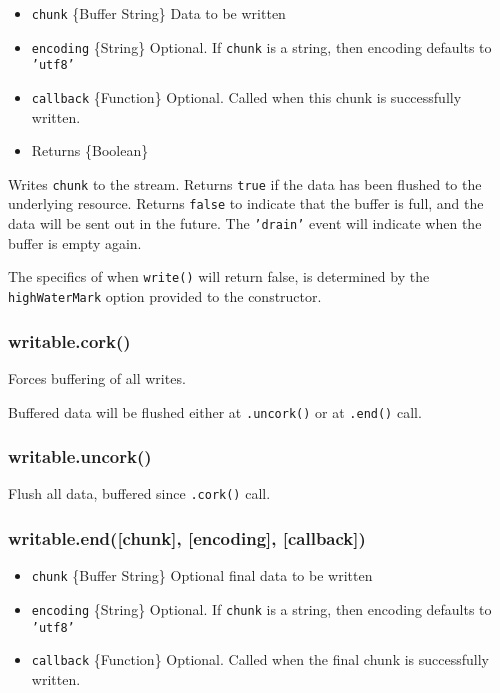 \begin{itemize}
\item
  \texttt{chunk} \{Buffer \textbar{} String\} Data to be written
\item
  \texttt{encoding} \{String\} Optional. If \texttt{chunk} is a string,
  then encoding defaults to \texttt{'utf8'}
\item
  \texttt{callback} \{Function\} Optional. Called when this chunk is
  successfully written.
\item
  Returns \{Boolean\}
\end{itemize}

Writes \texttt{chunk} to the stream. Returns \texttt{true} if the data
has been flushed to the underlying resource. Returns \texttt{false} to
indicate that the buffer is full, and the data will be sent out in the
future. The \texttt{'drain'} event will indicate when the buffer is
empty again.

The specifics of when \texttt{write()} will return false, is determined
by the \texttt{highWaterMark} option provided to the constructor.

\subsubsection{writable.cork()}

Forces buffering of all writes.

Buffered data will be flushed either at \texttt{.uncork()} or at
\texttt{.end()} call.

\subsubsection{writable.uncork()}

Flush all data, buffered since \texttt{.cork()} call.

\subsubsection{writable.end({[}chunk{]}, {[}encoding{]},
{[}callback{]})}

\begin{itemize}
\item
  \texttt{chunk} \{Buffer \textbar{} String\} Optional final data to be
  written
\item
  \texttt{encoding} \{String\} Optional. If \texttt{chunk} is a string,
  then encoding defaults to \texttt{'utf8'}
\item
  \texttt{callback} \{Function\} Optional. Called when the final chunk
  is successfully written.
\end{itemize}

